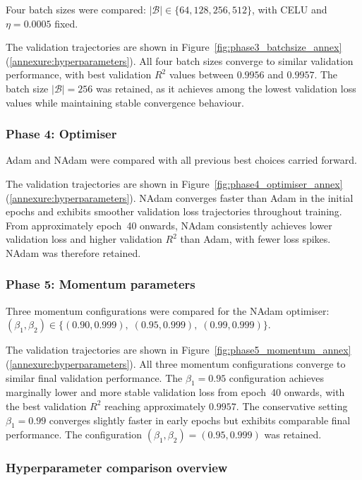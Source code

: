 Four batch sizes were compared:
$|\mathcal{B}| \in \{64, 128, 256, 512\}$, with CELU and
$\eta = 0.0005$ fixed.

\noindent
The validation trajectories are shown in
Figure~\ref{fig:phase3_batchsize_annex}
(\ref{annexure:hyperparameters}).
All four batch sizes converge to similar validation performance, with
best validation $R^2$ values between $0.9956$ and $0.9957$.  The batch
size $|\mathcal{B}| = 256$ was retained, as it achieves among the lowest
validation loss values while maintaining stable convergence behaviour.

\subsubsection{Phase 4: Optimiser}

Adam and NAdam were compared with all previous best choices carried
forward.

\noindent
The validation trajectories are shown in
Figure~\ref{fig:phase4_optimiser_annex}
(\ref{annexure:hyperparameters}).
NAdam converges faster than Adam in the initial epochs and exhibits
smoother validation loss trajectories throughout training.  From
approximately epoch~40 onwards, NAdam consistently achieves lower
validation loss and higher validation $R^2$ than Adam, with fewer loss
spikes.  NAdam was therefore retained.

\subsubsection{Phase 5: Momentum parameters}

Three momentum configurations were compared for the NAdam optimiser:
$(\beta_1, \beta_2) \in \{(0.90, 0.999),\; (0.95, 0.999),\;
(0.99, 0.999)\}$.

\noindent
The validation trajectories are shown in
Figure~\ref{fig:phase5_momentum_annex}
(\ref{annexure:hyperparameters}).
All three momentum configurations converge to similar final validation
performance.  The $\beta_1 = 0.95$ configuration achieves marginally
lower and more stable validation loss from epoch~40 onwards, with the
best validation $R^2$ reaching approximately $0.9957$.  The conservative
setting $\beta_1 = 0.99$ converges slightly faster in early epochs but
exhibits comparable final performance.  The configuration
$(\beta_1, \beta_2) = (0.95, 0.999)$ was retained.

\subsubsection{Hyperparameter comparison overview}

